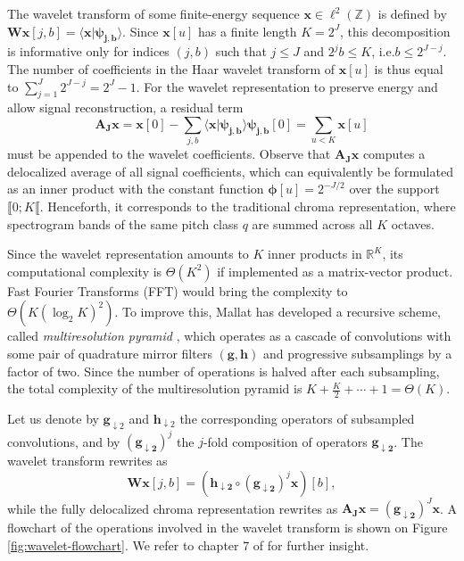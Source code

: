 \documentclass{article}
\makeatletter
\newcommand*{\ie}{i.e.\@\xspace}
\makeatother
\begin{document}
The wavelet transform of some finite-energy sequence
$\boldsymbol{x} \in \ell^2(\mathbb{Z})$ is defined by
$\mathbf{W} \boldsymbol{x}[j, b]
= \langle \boldsymbol{x} \vert \boldsymbol{\psi_{j,b}} \rangle$.
Since $\boldsymbol{x}[u]$ has a finite length $K = 2^J$,
this decomposition is informative only for indices $(j, b)$
such that $j \leq J$ and $2^j b \leq K$, \ie $b\leq2^{J-j}$.
The number of coefficients in the Haar wavelet transform of $\boldsymbol{x}[u]$ is thus equal to
$\sum_{j =1}^{J} 2^{J-j} = 2^J - 1$. For the wavelet representation to
preserve energy and allow signal reconstruction, a residual term
\begin{equation}
\boldsymbol{\mathbf{A}_J} \boldsymbol{x}
= \boldsymbol{x}[0] -
\sum_{j,b}
\langle \boldsymbol{x} \vert \boldsymbol{\psi_{j,b}} \rangle \boldsymbol{\psi_{j,b}}[0]
= \sum_{u<K} \boldsymbol{x}[u]
\label{eq:lowpass-term}
\end{equation}
must be appended to the wavelet coefficients.
Observe that $\boldsymbol{\mathbf{A}_J}  \boldsymbol{x}$
computes a delocalized average of all signal coefficients,
which can equivalently be formulated as an inner product with the constant
function $\boldsymbol{\phi}[u] = 2^{-J/2}$ over the support $\llbracket 0 ; K \llbracket$.
Henceforth, it corresponds to the traditional chroma representation, where spectrogram bands
of the same pitch class $q$ are summed across all $K$ octaves.

Since the wavelet representation amounts to $K$ inner products in $\mathbb{R}^K$,
its computational complexity is $\Theta(K^2)$ if implemented as a matrix-vector product.
Fast Fourier Transforms (FFT) would bring the complexity to
$\Theta{(K (\log_2 K)^2)}$.
To improve this, Mallat has developed a recursive scheme, called
\emph{multiresolution pyramid} \cite{mallat1989theory}, which operates as a cascade
of convolutions with some pair of quadrature mirror filters
$(\boldsymbol{g}, \boldsymbol{h})$ and progressive subsamplings by a factor of two.
Since the number of operations is halved after each subsampling, the total
complexity of the multiresolution pyramid is $K + \frac{K}{2} + \cdots + 1 = \Theta(K)$.

Let us denote by $\boldsymbol{g}_{\downarrow 2}$ and
$\boldsymbol{h}_{\downarrow 2}$ the corresponding operators of subsampled
convolutions, and by $(\boldsymbol{g_{\downarrow 2}})^j$ the $j$-fold composition
of operators $\boldsymbol{g_{\downarrow 2}}$.
The wavelet transform rewrites as
\begin{equation}
\mathbf{W}\boldsymbol{x}[j,b] =
\left(
\boldsymbol{h_{\downarrow 2}} \circ
(\boldsymbol{g_{\downarrow 2}})^j \boldsymbol{x}
\right)[b],
\end{equation}
while the fully delocalized chroma representation rewrites as
$\boldsymbol{\mathbf{A}_J} \boldsymbol{x} =
(\boldsymbol{g_{\downarrow 2}})^J \boldsymbol{x}$.
A flowchart of the operations involved in the wavelet transform is shown on
Figure \ref{fig:wavelet-flowchart}.
We refer to chapter 7 of \cite{mallat2008wavelet}
for further insight.
\end{document}
